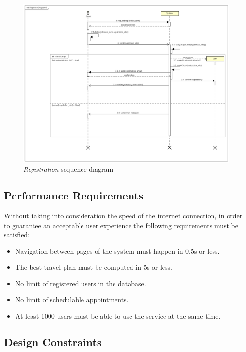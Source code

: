 \begin{figure}
	\includegraphics[width=\textheight,height=\textwidth,angle=90]{Img/RegistrationSQ}
	\caption{\emph{Registration} sequence diagram}
	\label{fig:registrationsq}
\end{figure}


\clearpage
\subsection{Performance Requirements}
Without taking into consideration the speed of the internet connection, in order to guarantee an acceptable user experience the following  requirements must be satisfied:
\begin{itemize}
\item Navigation between pages of the system must happen in 0.5s or less.
\item The  best travel plan must be computed in 5s or less.
\item No limit of registered users in the database.
\item No limit of schedulable appointments.
\item At least 1000 users must be able to use the service at the same time. 
\end{itemize}
\newpage
\subsection{Design Constraints}
